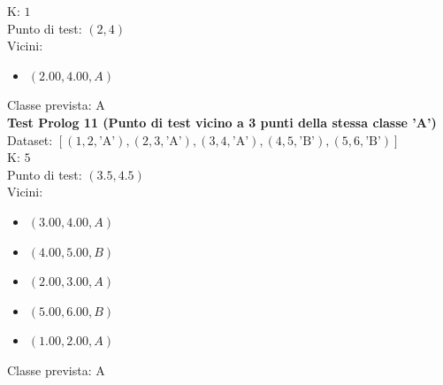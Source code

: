 \documentclass[11pt]{article}
\theoremstyle{definition}
\begin{document}
K: $1$\\
Punto di test: $(2, 4)$\\
Vicini:
\begin{itemize}
\item $(2.00,4.00, A)$
\end{itemize}
Classe prevista: A\\
\newline
\textbf{Test Prolog 11 (Punto di test vicino a 3 punti della stessa classe 'A')}\\
Dataset: $[(1, 2, \text{'A'}), (2, 3, \text{'A'}), (3, 4, \text{'A'}), (4, 5, \text{'B'}), (5, 6, \text{'B'})]$\\
K: $5$\\
Punto di test: $(3.5, 4.5)$\\
Vicini:
\begin{itemize}
\item $(3.00,4.00,A)$
\item $(4.00,5.00,B)$
\item $(2.00,3.00,A)$
\item $(5.00,6.00,B)$
\item $(1.00,2.00,A)$
\end{itemize}
Classe prevista: A
\end{document}
